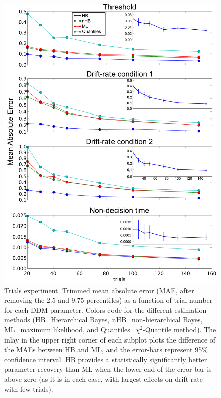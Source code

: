 \documentclass[letterpaper,10pt,english]{article}
\begin{document}
\begin{figure}
\includegraphics[width=.7\columnwidth]{trials_exp_single_mean_inlay.pdf}
\caption{Trials experiment. Trimmed mean absolute error (MAE, after removing the 2.5 and 9.75 percentiles) as a function of trial number for each DDM parameter. Colors code for the different estimation methods (HB=Hierarchical Bayes, nHB=non-hierarchical Bayes, ML=maximum likelihood, and Quantiles=$\chi^2$-Quantile method). The inlay in the upper right corner of each subplot plots the difference of the MAEs between HB and ML, and the error-bars represent 95\% confidence interval.  HB provides a statistically significantly better parameter recovery than ML when the lower end of the error bar is above zero (as it is in each case, with largest effects on drift rate with few trials).}
\label{fig.trials}
\end{figure}
\end{document}
